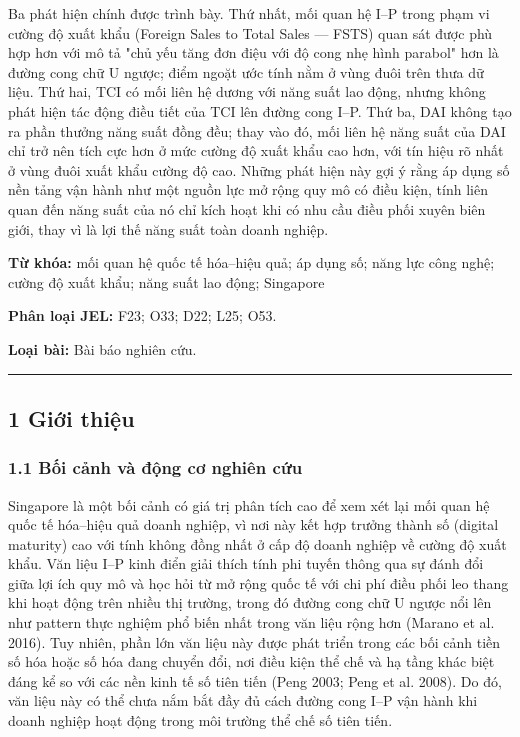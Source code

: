 \documentclass[12pt,a4paper]{article}
\begin{document}
Ba phát hiện chính được trình bày. Thứ nhất, mối quan hệ I--P trong phạm
vi cường độ xuất khẩu (Foreign Sales to Total Sales --- FSTS) quan sát
được phù hợp hơn với mô tả "chủ yếu tăng đơn điệu với độ cong nhẹ hình
parabol" hơn là đường cong chữ U ngược; điểm ngoặt ước tính nằm ở vùng
đuôi trên thưa dữ liệu. Thứ hai, TCI có mối liên hệ dương với năng suất
lao động, nhưng không phát hiện tác động điều tiết của TCI lên đường
cong I--P. Thứ ba, DAI không tạo ra phần thưởng năng suất đồng đều; thay
vào đó, mối liên hệ năng suất của DAI chỉ trở nên tích cực hơn ở mức
cường độ xuất khẩu cao hơn, với tín hiệu rõ nhất ở vùng đuôi xuất khẩu
cường độ cao. Những phát hiện này gợi ý rằng áp dụng số nền tảng vận
hành như một nguồn lực mở rộng quy mô có điều kiện, tính liên quan đến
năng suất của nó chỉ kích hoạt khi có nhu cầu điều phối xuyên biên giới,
thay vì là lợi thế năng suất toàn doanh nghiệp.

\textbf{Từ khóa:} mối quan hệ quốc tế hóa--hiệu quả; áp dụng số; năng
lực công nghệ; cường độ xuất khẩu; năng suất lao động; Singapore

\textbf{Phân loại JEL:} F23; O33; D22; L25; O53.

\textbf{Loại bài:} Bài báo nghiên cứu.

\begin{center}\rule{0.5\linewidth}{0.5pt}\end{center}

\hypertarget{1-giux1edbi-thiux1ec7u}{%
\subsection{1 Giới thiệu}\label{1-giux1edbi-thiux1ec7u}}

\hypertarget{11-bux1ed1i-cux1ea3nh-vuxe0-ux111ux1ed9ng-cux1a1-nghiuxean-cux1ee9u}{%
\subsubsection{1.1 Bối cảnh và động cơ nghiên
cứu}\label{11-bux1ed1i-cux1ea3nh-vuxe0-ux111ux1ed9ng-cux1a1-nghiuxean-cux1ee9u}}

Singapore là một bối cảnh có giá trị phân tích cao để xem xét lại mối
quan hệ quốc tế hóa--hiệu quả doanh nghiệp, vì nơi này kết hợp trưởng
thành số (digital maturity) cao với tính không đồng nhất ở cấp độ doanh
nghiệp về cường độ xuất khẩu. Văn liệu I--P kinh điển giải thích tính
phi tuyến thông qua sự đánh đổi giữa lợi ích quy mô và học hỏi từ mở
rộng quốc tế với chi phí điều phối leo thang khi hoạt động trên nhiều
thị trường, trong đó đường cong chữ U ngược nổi lên như pattern thực
nghiệm phổ biến nhất trong văn liệu rộng hơn (Marano et al. 2016). Tuy
nhiên, phần lớn văn liệu này được phát triển trong các bối cảnh tiền số
hóa hoặc số hóa đang chuyển đổi, nơi điều kiện thể chế và hạ tầng khác
biệt đáng kể so với các nền kinh tế số tiên tiến (Peng 2003; Peng et al.
2008). Do đó, văn liệu này có thể chưa nắm bắt đầy đủ cách đường cong
I--P vận hành khi doanh nghiệp hoạt động trong môi trường thể chế số
tiên tiến.
\end{document}
